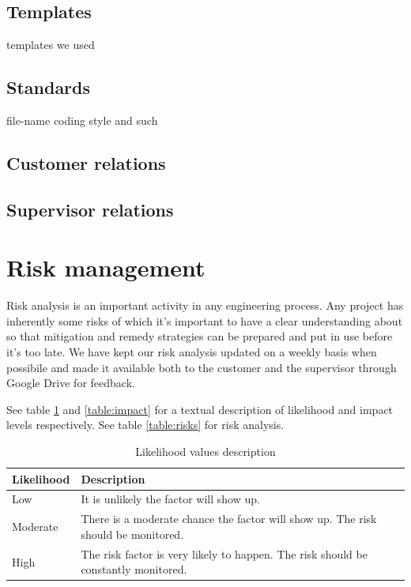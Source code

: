 \subsection{Templates}
templates we used
\subsection{Standards}
file-name coding style and such
\subsection{Customer relations}
\subsection{Supervisor relations}

\newpage
\section{Risk management}
\label{section:risk}

Risk analysis is an important activity in any engineering process.
Any project has inherently some risks of which it's important to have a clear
understanding about so that mitigation and remedy strategies can be prepared
and put in use before it's too late. We have kept our risk analysis updated on a weekly
basis when possibile and made it available both to the customer and the supervisor through
Google Drive for feedback.

See table \ref{table:likelihood} and \ref{table:impact} for a textual description of
likelihood and impact levels respectively. See table \ref{table:risks} for risk analysis.

\begin{table}[h]
\begin{tabular}{ | l | p{11.5cm} | }
  \hline
  \textbf{Likelihood} & \textbf{Description} \\
  \hline\noalign{\smallskip}\noalign{\smallskip}\hline
  Low       & It is unlikely the factor will show up. \\
  Moderate  & There is a moderate chance the factor will show up. The risk should be monitored. \\
  High      & The risk factor is very likely to happen. The risk should be constantly monitored. \\
  \hline
\end{tabular}
\caption{Likelihood values description}
\label{table:likelihood}
\end{table}

